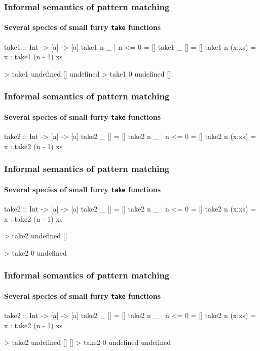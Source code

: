 \documentclass{beamer}
\begin{document}
\begin{frame}[fragile]
  \frametitle{Informal semantics of pattern matching}
  \framesubtitle{Several species of small furry \texttt{take} functions}

  \begin{code}
take1 :: Int -> [a] -> [a]
take1 n _      | n <= 0 = []
take1 _ []              = []
take1 n (x:xs)          = x : take1 (n - 1) xs
  \end{code}
  \begin{code}
> take1 undefined []
undefined
> take1 0 undefined
[]
  \end{code}
\end{frame}

\begin{frame}[fragile]
  \frametitle{Informal semantics of pattern matching}
  \framesubtitle{Several species of small furry \texttt{take} functions}

  \begin{code}
take2 :: Int -> [a] -> [a]
take2 _ []              = []
take2 n _      | n <= 0 = []
take2 n (x:xs)          = x : take2 (n - 1) xs
  \end{code}
\end{frame}

\begin{frame}[fragile]
  \frametitle{Informal semantics of pattern matching}
  \framesubtitle{Several species of small furry \texttt{take} functions}

  \begin{code}
take2 :: Int -> [a] -> [a]
take2 _ []              = []
take2 n _      | n <= 0 = []
take2 n (x:xs)          = x : take2 (n - 1) xs
  \end{code}
  \begin{code}
> take2 undefined []

> take2 0 undefined

  \end{code}
\end{frame}

\begin{frame}[fragile]
  \frametitle{Informal semantics of pattern matching}
  \framesubtitle{Several species of small furry \texttt{take} functions}

  \begin{code}
take2 :: Int -> [a] -> [a]
take2 _ []              = []
take2 n _      | n <= 0 = []
take2 n (x:xs)          = x : take2 (n - 1) xs
  \end{code}
  \begin{code}
> take2 undefined []
[]
> take2 0 undefined
undefined
  \end{code}
\end{frame}
\end{document}
